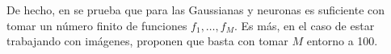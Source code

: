 
De hecho, en \cite{matematicas:principal} se prueba que para las Gaussianas y neuronas es suficiente con tomar un número finito de funciones ${f_1, \ldots, f_M}$. Es más, en el caso de estar trabajando con imágenes, proponen que basta con tomar $M$ entorno a 100.
